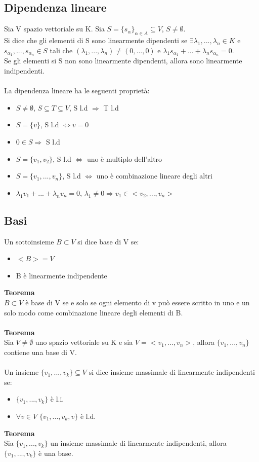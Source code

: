\documentclass{article}
\begin{document}
\subsection{Dipendenza lineare}
Sia V spazio vettoriale su K. Sia $S=\{s_\alpha\}_{\alpha\in A}\subseteq V$, $S\neq\emptyset$.\\
Si dice che gli elementi di S sono linearmente dipendenti se $\exists \lambda_1,...,\lambda_n\in K$ e $s_{\alpha_1},...,s_{\alpha_n}\in S$ tali che $(\lambda_1,...,\lambda_n)\neq(0,...,0)$ e $\lambda_1 s_{\alpha_1}+...+\lambda_n s_{\alpha_n}=0$.\\
Se gli elementi si S non sono linearmente dipendenti, allora sono linearmente indipendenti.\\\\
La dipendenza lineare ha le seguenti proprietà:
\begin{itemize}
    \item $S\neq\emptyset$, $S\subseteq T\subseteq V$, S l.d $\Rightarrow$ T l.d
    \item $S=\{v\}$, S l.d $\Leftrightarrow v=0$
    \item $0\in S\Rightarrow$ S l.d
    \item $S=\{v_1,v_2\}$, S l.d $\Leftrightarrow$ uno è multiplo dell'altro
    \item $S=\{v_1,...,v_n\}$, S l.d $\Leftrightarrow$ uno è combinazione lineare degli altri
    \item $\lambda_1 v_1+...+\lambda_n v_n=0$, $\lambda_1\neq 0\Rightarrow v_1\in <v_2,...,v_n>$
\end{itemize}

\subsection{Basi}
Un sottoinsieme $B\subset V$ si dice base di V se:
\begin{itemize}
    \item $<B>=V$
    \item B è linearmente indipendente
\end{itemize}
\textbf{Teorema}\\
$B\subset V$ è base di V se e solo se ogni elemento di v può essere scritto in uno e un solo modo come combinazione lineare degli elementi di B.\\\\
\textbf{Teorema}\\
Sia $V\neq\emptyset$ uno spazio vettoriale su K e sia $V=<v_1,...,v_n>$, allora $\{v_1,...,v_n\}$ contiene una base di V.\\\\
Un insieme $\{v_1,...,v_k\}\subseteq V$ si dice insieme massimale di linearmente indipendenti se:
\begin{itemize}
    \item $\{v_1,...,v_k\}$ è l.i.
    \item $\forall v\in V$ $\{v_1,...,v_k,v\}$ è l.d.
\end{itemize}
\textbf{Teorema}\\
Sia $\{v_1,...,v_k\}$ un insieme massimale di linearmente indipendenti, allora $\{v_1,...,v_k\}$ è una base.\\\\
\end{document}
